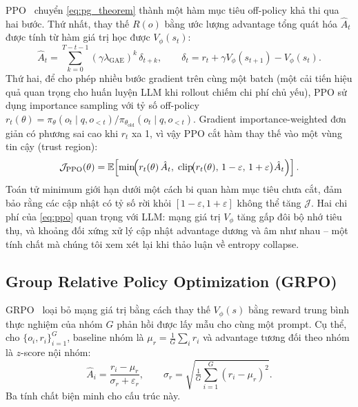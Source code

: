 \documentclass[11pt,a4paper]{article}
\begin{document}
PPO~\citep{schulman2017proximal} chuyển \eqref{eq:pg_theorem} thành một hàm mục tiêu
off-policy khả thi qua hai bước. Thứ nhất, thay thế \(R(o)\) bằng ước lượng
advantage tổng quát hóa \(\hat{A}_t\) được tính từ hàm giá trị học được
\(V_\phi(s_t)\):
\begin{equation}
  \hat{A}_t = \sum_{k=0}^{T-t-1}(\gamma\lambda_{\text{GAE}})^k\,\delta_{t+k},\qquad
  \delta_t = r_t + \gamma V_\phi(s_{t+1}) - V_\phi(s_t).
\end{equation}
Thứ hai, để cho phép nhiều bước gradient trên cùng một batch (một cải tiến hiệu quả
quan trọng cho huấn luyện LLM khi rollout chiếm chi phí chủ yếu), PPO sử dụng importance sampling
với tỷ số off-policy
\(r_t(\theta)=\pi_\theta(o_t\mid q,o_{<t})/\pi_{\theta_{\text{old}}}(o_t\mid q,o_{<t})\).
Gradient importance-weighted đơn giản có phương sai cao khi \(r_t\) xa 1,
vì vậy PPO cắt hàm thay thế vào một vùng tin cậy (trust region):
\begin{equation}
  \mathcal{J}_{\text{PPO}}(\theta)=
  \mathbb{E}\!\left[
    \min\!\Bigl(r_t(\theta)\,\hat{A}_t,\;
           \operatorname{clip}\!\bigl(r_t(\theta),\,1-\varepsilon,\,1+\varepsilon\bigr)\hat{A}_t\Bigr)
  \right].
\label{eq:ppo}
\end{equation}
Toán tử minimum giới hạn dưới một cách bi quan hàm mục tiêu chưa cắt, đảm bảo
rằng các cập nhật có tỷ số rời khỏi \([1-\varepsilon,1+\varepsilon]\) không thể tăng
\(\mathcal{J}\). Hai chi phí của \eqref{eq:ppo} quan trọng với LLM: mạng giá trị
\(V_\phi\) tăng gấp đôi bộ nhớ tiêu thụ, và khoảng đối xứng xử lý cập nhật
advantage dương và âm như nhau -- một tính chất mà chúng tôi xem xét lại khi thảo luận
về entropy collapse.

\subsection{Group Relative Policy Optimization (GRPO)}

GRPO~\citep{shao2024deepseekmath} loại bỏ mạng giá trị bằng cách thay thế
\(V_\phi(s)\) bằng reward trung bình thực nghiệm của nhóm \(G\) phản hồi được lấy mẫu cho
cùng một prompt. Cụ thể, cho \(\{o_i,r_i\}_{i=1}^G\), baseline nhóm là
\(\mu_r=\tfrac{1}{G}\sum_i r_i\) và advantage tương đối theo nhóm là \(z\)-score nội nhóm:
\begin{equation}
  \hat{A}_i = \frac{r_i - \mu_r}{\sigma_r + \varepsilon_r},\qquad
  \sigma_r = \sqrt{\tfrac{1}{G}\sum_{i=1}^G (r_i-\mu_r)^2}.
\label{eq:grpo_adv}
\end{equation}
Ba tính chất biện minh cho cấu trúc này.
\end{document}
